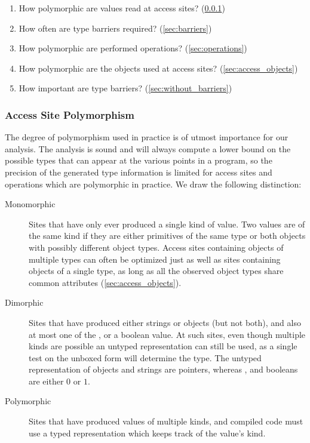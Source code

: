 \begin{enumerate}

\item How polymorphic are values read at access sites?  (\Section\ref{sec:access_polymorphism})

\item How often are type barriers required?  (\Section\ref{sec:barriers})

\item How polymorphic are performed operations?  (\Section\ref{sec:operations})

\item How polymorphic are the objects used at access sites?  (\Section\ref{sec:access_objects})

\item How important are type barriers?  (\Section\ref{sec:without_barriers})

\end{enumerate}



\subsubsection{Access Site Polymorphism}
\label{sec:access_polymorphism}

The degree of polymorphism used in practice is of utmost importance
for our analysis.
The analysis is sound and will always compute a lower bound on the possible
types that can appear at the various points in a program,
so the precision of the generated type information is limited for
access sites and operations which are polymorphic in practice.
We draw the following distinction:

\begin{description}

\item[Monomorphic] Sites that have only ever produced a single kind of value.
Two values are of the same kind if they are either primitives of the same
type or both objects with possibly different
object types.
Access sites containing objects of multiple types can often be optimized
just as well as sites containing objects of a single type, as long as
all the observed object types share common attributes (\Section\ref{sec:access_objects}).

\item[Dimorphic] Sites that have produced either strings or objects (but not both),
and also at most one of the ,  or a boolean value.
At such sites, even though multiple kinds are possible an untyped
representation can still be used,
as a single test on the unboxed form will determine the type.
The untyped representation of objects and strings are pointers,
whereas ,  and booleans are either $0$ or $1$.

\item[Polymorphic] Sites that have produced values of multiple kinds,
and compiled code must use a typed representation which keeps track of
the value's kind.

\end{description}


